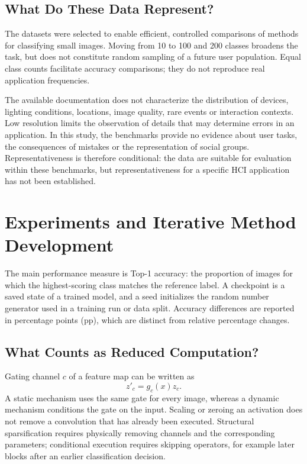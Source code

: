 \documentclass[12pt,a4paper]{article}
\newcommand{\pp}{pp}
\begin{document}
\subsection{What Do These Data Represent?}

The datasets were selected to enable efficient, controlled comparisons
of methods for classifying small images. Moving from 10 to 100 and 200
classes broadens the task, but does not constitute random sampling of
a future user population. Equal class counts facilitate accuracy comparisons;
they do not reproduce real application frequencies.

The available documentation does not characterize the distribution of
devices, lighting conditions, locations, image quality, rare events or
interaction contexts. Low resolution limits the observation of details
that may determine errors in an application.
In this study, the benchmarks provide no evidence about user tasks,
the consequences of mistakes or the representation of social groups.
Representativeness is therefore conditional: the data are suitable for
evaluation within these benchmarks, but representativeness for a specific
HCI application has not been established.

\section{Experiments and Iterative Method Development}

The main performance measure is Top-1 accuracy: the proportion of images
for which the highest-scoring class matches the reference label.
A checkpoint is a saved state of a trained model, and a seed initializes
the random number generator used in a training run or data split.
Accuracy differences are reported in percentage points (\pp),
which are distinct from relative percentage changes.

\subsection{What Counts as Reduced Computation?}

Gating channel $c$ of a feature map can be written as
\begin{equation}
z'_c=g_c(x)z_c.
\end{equation}
A static mechanism uses the same gate for every image, whereas a dynamic
mechanism conditions the gate on the input. Scaling or zeroing an activation
does not remove a convolution that has already been executed.
Structural sparsification requires physically removing channels and the
corresponding parameters; conditional execution requires skipping operators,
for example later blocks after an earlier classification decision.
\end{document}
